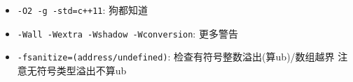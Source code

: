 \begin{itemize}
	\item \texttt{-O2 -g -std=c++11}: 狗都知道
	\item \texttt{-Wall -Wextra -Wshadow -Wconversion}: 更多警告
	\item \texttt{-fsanitize=(address/undefined)}: 检查有符号整数溢出(算ub)/数组越界
		\subitem 注意无符号类型溢出不算ub
\end{itemize}